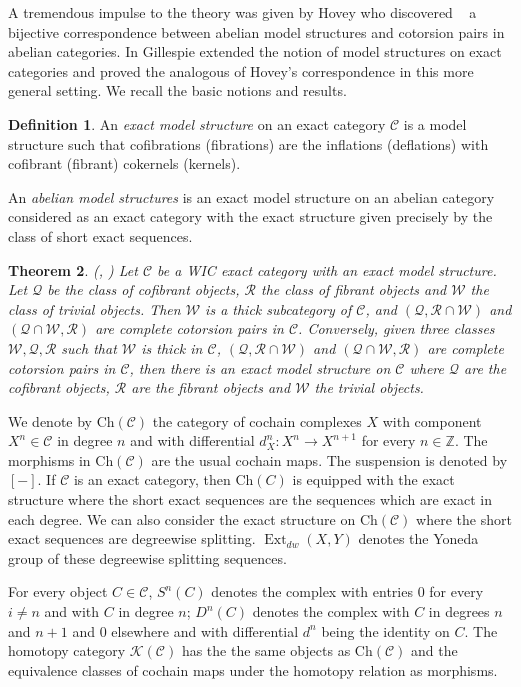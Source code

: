\documentclass[11pt,a4paper,reqno]{amsart}
\newcommand{\bbZ}{\mathbb{Z}}
\newcommand{\Ext}{\operatorname{Ext}}
\newcommand{\C}{\mathcal{C}}
\newcommand{\K}{\mathcal{K}}
\newcommand{\clQ}{\mathcal{Q}}
\newcommand{\R}{\mathcal{R}}
\newcommand{\W}{\mathcal{W}}
\newcommand{\Ch}{\mathrm{Ch}}
\theoremstyle{plain}
\newtheorem{thm}{Theorem}[section]
\theoremstyle{definition}
\newtheorem{defn}[thm]{Definition}
\theoremstyle{remark}
\begin{document}
A tremendous impulse to the theory was given by  Hovey who discovered ~\cite{Hov07} a bijective correspondence between abelian model structures and cotorsion pairs in abelian categories.
%
In \cite{G5} Gillespie extended the notion of model structures on exact categories and proved the analogous of Hovey's correspondence in this more general setting.
 We recall the basic notions and results.
 \begin{defn}\label{D:exact-model} An \emph{exact model structure} on an exact category $\C$ is a model structure such that cofibrations (fibrations) are the inflations (deflations) with cofibrant (fibrant) cokernels (kernels).

   An \emph{abelian model structures} is an exact model structure on an abelian category considered as an exact category with the exact structure given precisely by the class of short exact sequences.
\end{defn}
%
\begin{thm}\label{T:correspondence} (\cite{Hov07}, \cite{G5}) Let $\C$ be a WIC exact category with an exact model structure. Let $\clQ$ be the class of cofibrant objects, $\R$ the class of fibrant objects and $\W$ the class of trivial objects. Then $\W$ is a thick subcategory of $\C$, and $(\clQ, \R\cap \W)$ and $(\clQ\cap\W, \R)$ are complete cotorsion pairs in $\C$.
Conversely, given three classes $\W, \clQ, \R$ such that $\W$ is thick in $\C$, $(\clQ, \R\cap \W)$ and $(\clQ\cap\W, \R)$ are complete cotorsion pairs in $\C$, then there is an exact model structure on $\C$ where $\clQ$ are the cofibrant objects, $\R$ are the fibrant objects and $\W$ the trivial objects.
\end{thm}

We denote by $\Ch(\C)$ the category of cochain complexes $X$ with component $X^n\in \C$ in degree $n$ and with differential $d^n_X\colon X^n\to X^{n+1}$ for every $n\in \bbZ$. The morphisms in $\Ch(\C)$ are the usual cochain maps. The suspension is denoted by $[-]$.
 If $\C$ is an exact category, then $\Ch(C)$ is equipped with the exact structure where the short exact sequences are the sequences which are exact in each degree. We can also consider the exact structure on $\Ch(\C)$ where the short exact sequences are degreewise splitting. $\Ext_{dw}(X, Y)$ denotes the Yoneda group of these degreewise splitting sequences.

 For every object $C\in \C$, $S^n(C)$ denotes the complex with entries $0$ for every $i\neq n$ and with $C$ in degree $n$; $D^n(C)$ denotes the complex with $C$ in degrees $n$ and $n+1$ and $0$ elsewhere and with differential $d^n$ being the identity on $C$. The homotopy category $\K(\C)$ has the the same objects as $\Ch(\C)$ and the equivalence classes of cochain maps under the homotopy relation as morphisms.
\end{document}
